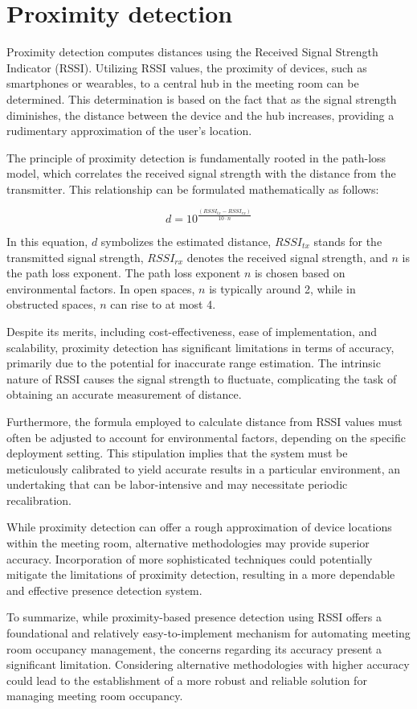 \section{Proximity detection}\label{sec:proximity_detection}
Proximity detection computes distances using the Received Signal Strength Indicator (RSSI).
Utilizing RSSI values, the proximity of devices, such as smartphones or wearables, to a central hub in the meeting room can be determined. This determination is based on the fact that as the signal strength diminishes, the distance between the device and the hub increases, providing a rudimentary approximation of the user's location.\cite{spachosBLEBeaconsIndoor2020}

The principle of proximity detection is fundamentally rooted in the path-loss model, which correlates the received signal strength with the distance from the transmitter. This relationship can be formulated mathematically as follows:

$$
d = 10^{ \frac{(RSSI_{tx} - RSSI_{rx})}{10 \cdot n}}
$$\cite{spachosBLEBeaconsIndoor2020}

In this equation, \(d\) symbolizes the estimated distance, \(RSSI_{tx}\) stands for the transmitted signal strength, \(RSSI_{rx}\) denotes the received signal strength, and \(n\) is the path loss exponent. The path loss exponent \(n\) is chosen based on environmental factors. In open spaces, \(n\) is typically around 2, while in obstructed spaces, \(n\) can rise to at most 4.\cite{spachosBLEBeaconsIndoor2020, mathuranathanLogDistancePath2013}

Despite its merits, including cost-effectiveness, ease of implementation, and scalability, proximity detection has significant limitations in terms of accuracy, primarily due to the potential for inaccurate range estimation. The intrinsic nature of RSSI causes the signal strength to fluctuate, complicating the task of obtaining an accurate measurement of distance.\cite{spachosBLEBeaconsIndoor2020}

Furthermore, the formula employed to calculate distance from RSSI values must often be adjusted to account for environmental factors, depending on the specific deployment setting. This stipulation implies that the system must be meticulously calibrated to yield accurate results in a particular environment, an undertaking that can be labor-intensive and may necessitate periodic recalibration.\cite{spachosBLEBeaconsIndoor2020}

While proximity detection can offer a rough approximation of device locations within the meeting room, alternative methodologies may provide superior accuracy. Incorporation of more sophisticated techniques could potentially mitigate the limitations of proximity detection, resulting in a more dependable and effective presence detection system.

To summarize, while proximity-based presence detection using RSSI offers a foundational and relatively easy-to-implement mechanism for automating meeting room occupancy management, the concerns regarding its accuracy present a significant limitation. Considering alternative methodologies with higher accuracy could lead to the establishment of a more robust and reliable solution for managing meeting room occupancy.
